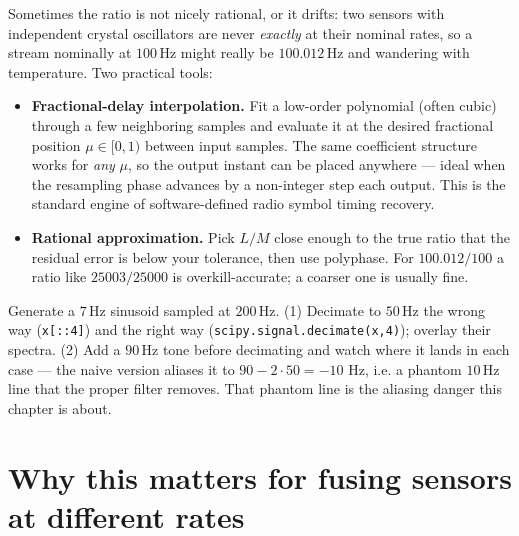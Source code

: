 Sometimes the ratio is not nicely rational, or it drifts: two sensors with
independent crystal oscillators are never \emph{exactly} at their nominal rates,
so a stream nominally at $100$\,Hz might really be $100.012$\,Hz and wandering with
temperature. Two practical tools:
\begin{itemize}
  \item \textbf{Fractional-delay interpolation.} Fit a low-order
  polynomial (often cubic) through a few neighboring samples and evaluate it at
  the desired fractional position $\mu \in [0,1)$ between input samples. The same
  coefficient structure works for \emph{any} $\mu$, so the output instant can be
  placed anywhere --- ideal when the resampling phase advances by a
  non-integer step each output. This is the standard engine of software-defined radio
  symbol timing recovery.
  \item \textbf{Rational approximation.} Pick $L/M$ close enough to the true
  ratio that the residual error is below your tolerance, then use polyphase. For
  $100.012/100$ a ratio like $25003/25000$ is overkill-accurate; a coarser one
  is usually fine.
\end{itemize}

\begin{labbox}
Generate a $7$\,Hz sinusoid sampled at $200$\,Hz. (1) Decimate to $50$\,Hz the wrong
way (\texttt{x[::4]}) and the right way (\texttt{scipy.signal.decimate(x,4)});
overlay their spectra. (2) Add a $90$\,Hz tone before decimating and watch where it
lands in each case --- the naive version aliases it to $90-2\cdot 50 = -10$ Hz,
i.e. a phantom $10$\,Hz line that the proper filter removes. That phantom line is
the aliasing danger this chapter is about.
\end{labbox}

\section{Why this matters for fusing sensors at different rates}
\label{ch22:fusion}

